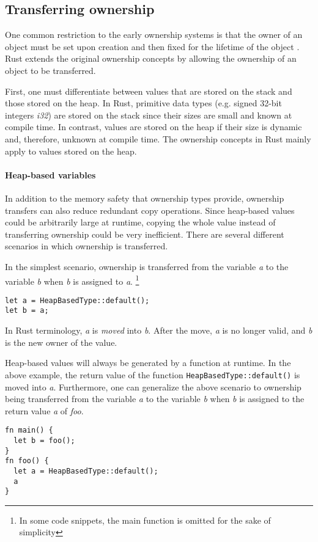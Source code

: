 \documentclass[sigplan,11pt,nonacm]{acmart}
\begin{document}
\subsection{Transferring ownership}
\label{sec:rust-transferring-ownership}

One common restriction to the early ownership systems is that the owner of an object must be set upon creation and then fixed for the lifetime of the object \cite{ownership-types-survey}.
Rust extends the original ownership concepts by allowing the ownership of an object to be transferred.

First, one must differentiate between values that are stored on the stack and those stored on the heap.
In Rust, primitive data types (e.g. signed 32-bit integers \emph{i32}) are stored on the stack since their sizes are small and known at compile time.
In contrast, values are stored on the heap if their size is dynamic and, therefore, unknown at compile time.
The ownership concepts in Rust mainly apply to values stored on the heap.

\paragraph{Heap-based variables}

In addition to the memory safety that ownership types provide, ownership transfers can also reduce redundant copy operations.
Since heap-based values could be arbitrarily large at runtime, copying the whole value instead of transferring ownership could be very inefficient.
There are several different scenarios in which ownership is transferred.

In the simplest scenario, ownership is transferred from the variable \emph{a} to the variable \emph{b} when \emph{b} is assigned to \emph{a}.
\footnote{In some code snippets, the main function is omitted for the sake of simplicity}

\begin{lstlisting}
let a = HeapBasedType::default();
let b = a;
\end{lstlisting}
In Rust terminology, \emph{a} is \emph{moved} into \emph{b}.
After the move, \emph{a} is no longer valid, and \emph{b} is the new owner of the value.

Heap-based values will always be generated by a function at runtime.
In the above example, the return value of the function \verb|HeapBasedType::default()| is moved into \emph{a}.
Furthermore, one can generalize the above scenario to ownership being transferred from the variable \emph{a} to the variable \emph{b} when \emph{b} is assigned to the return value \emph{a} of \emph{foo}.
\begin{lstlisting}
fn main() {
  let b = foo();
}
fn foo() {
  let a = HeapBasedType::default();
  a
}
\end{lstlisting}
\end{document}
